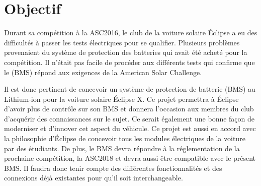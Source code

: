 \section{Objectif}
Durant sa compétition à la ASC2016, le club de la voiture solaire Éclipse a eu des difficultés à passer les tests électriques pour se qualifier. Plusieurs problèmes provenaient du système de protection des batteries qui avait été acheté pour la compétition. Il n'était pas facile de procéder aux différents tests qui confirme que le (BMS) répond aux exigences de la American Solar Challenge.

Il est donc pertinent de concevoir un système de protection de batterie (BMS) au Lithium-ion pour la voiture solaire Éclipse X. Ce projet permettra à Éclipse d’avoir plus de contrôle sur son BMS et donnera l’occasion aux membres du club d’acquérir des connaissances sur le sujet. Ce serait également une bonne façon de moderniser et d'innover cet aspect du véhicule. Ce projet est aussi en accord avec la philosophie d’Éclipse de concevoir tous les modules électriques de la voiture par des étudiants. De plus, le BMS devra répondre à la réglementation de la prochaine compétition, la ASC2018 et devra aussi être compatible avec le présent BMS. Il faudra donc tenir compte des différentes fonctionnalités et des connexions déjà existantes pour qu’il soit interchangeable.
